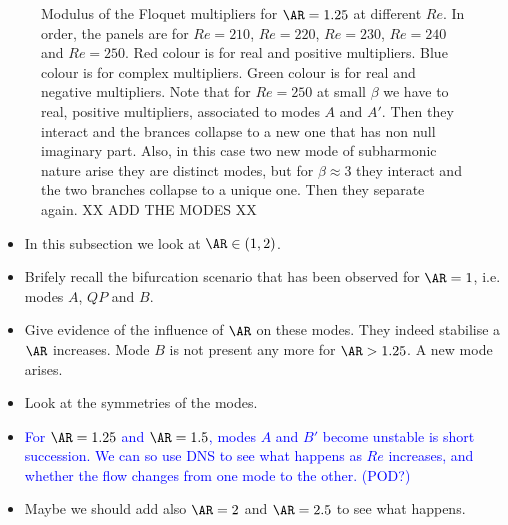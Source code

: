 \begin{figure}
  \caption{Modulus of the Floquet multipliers for $\AR=1.25$ at different $Re$. In order, the panels are for $Re=210$, $Re=220$, $Re=230$, $Re=240$ and $Re=250$. Red colour is for real and positive multipliers. Blue colour is for complex multipliers. Green colour is for real and negative multipliers. Note that for $Re=250$ at small $\beta$ we have to real, positive multipliers, associated to modes $A$ and $A'$. Then they interact and the brances collapse to a new one that has non null imaginary part. Also, in this case two new mode of subharmonic nature arise they are distinct modes, but for $\beta \approx 3$ they interact and the two branches collapse to a unique one. Then they separate again. XX ADD THE MODES XX}
\end{figure}


\begin{itemize}
  \item In this subsection we look at $\AR \in (1,2)$.
  \item Brifely recall the bifurcation scenario that has been observed for $\AR=1$, i.e. modes $A$, $QP$ and $B$.
  \item Give evidence of the influence of $\AR$ on these modes. They indeed stabilise a $\AR$ increases. Mode $B$ is not present any more for $\AR>1.25$. A new mode arises.
  \item Look at the symmetries of the modes.  
  \item \textcolor{blue}{For $\AR=1.25$ and $\AR=1.5$, modes $A$ and $B'$ become unstable is short succession. We can so use DNS to see what happens as $Re$ increases, and whether the flow changes from one mode to the other. (POD?)}
  \item Maybe we should add also $\AR=2$ and $\AR=2.5$ to see what happens.
\end{itemize}
